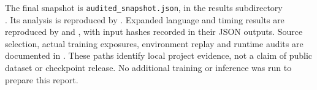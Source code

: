 \documentclass[10pt,letterpaper]{article}
\newcommand{\code}[1]{\texttt{#1}}
\begin{document}
The final snapshot is \code{audited\_snapshot.json}, in the results subdirectory\\
. Its analysis is reproduced by . Expanded language and timing results are reproduced by  and , with input hashes recorded in their JSON outputs. Source selection, actual training exposures, environment replay and runtime audits are documented in . These paths identify local project evidence, not a claim of public dataset or checkpoint release. No additional training or inference was run to prepare this report.
\end{document}
